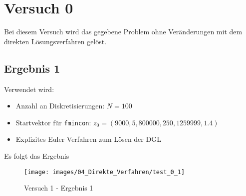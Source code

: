 












\newpage
\section{Versuch 0}\label{kap:Versuch0}
Bei diesem Versuch wird das gegebene Problem ohne Veränderungen mit dem direkten Lösungsverfahren gelöst.

\subsection{Ergebnis 1}\label{kap:Versuch0Ergebnis1}
Verwendet wird:
\begin{itemize}
\item Anzahl an Diskretisierungen: $N = 100$ 
\item Startvektor für \texttt{fmincon}: $z_0 = (9000,5,800000,250,1259999,1.4)$
\item Explizites Euler Verfahren zum Lösen der DGL
\end{itemize}
Es folgt das Ergebnis
\begin{figure}[H]
\begin{center}
\texttt{[image: images/04\_Direkte\_Verfahren/test\_0\_1]}
\caption{Versuch 1 - Ergebnis 1}\label{img:test_0_1}
\end{center}
\end{figure}

\newpage
